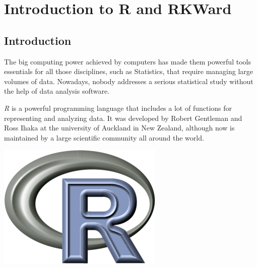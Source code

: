 
\chapter{Introduction to R and RKWard}\label{cha:introduction}

\section{Introduction}
The big computing power achieved by computers has made them powerful tools essentials for all those disciplines, such as
Statistics, that require managing large volumes of data.
Nowadays, nobody addresses a serious statistical study without the help of data analysis software. 

\emph{R} is a powerful programming language that includes a lot of functions for representing and analyzing data. 
It was developed by Robert Gentleman and Ross Ihaka at the university of Auckland in New Zealand, although now is
maintained by a large scientific community all around the world.

\begin{center}
\includegraphics[scale=0.5]{chapters/introduction/img/Rlogo}
\end{center} 

